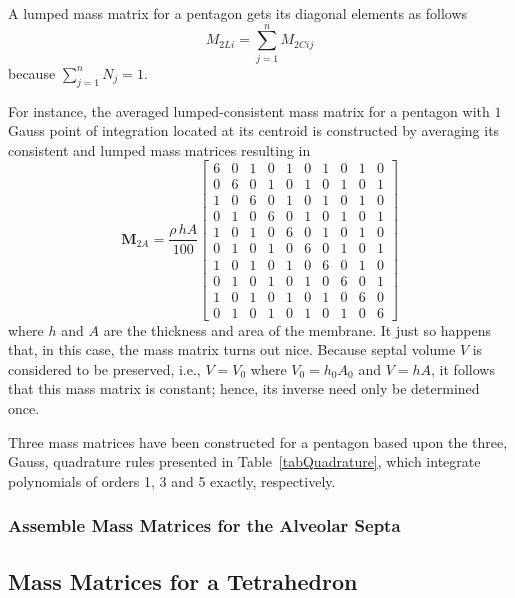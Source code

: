 A lumped mass matrix for a pentagon gets its diagonal elements as follows
\begin{equation}
{M}_{2Li} = \sum_{j=1}^n M_{2Cij}
\label{LumMass2D}
\end{equation}
because $\sum_{j=1}^n N_j = 1$. 

For instance, the averaged lumped-consistent mass matrix for a pentagon with $1$ Gauss point of integration located at its centroid is constructed by averaging its consistent and lumped mass matrices resulting in
\begin{equation}
\mathbf{M}_{2A}  = \frac{\rho \, h A}{100}
\begin{bmatrix}
6 & 0 & 1 & 0 & 1 & 0 & 1 & 0 & 1 & 0 \\
0 & 6 & 0 & 1 & 0 & 1 & 0 & 1 & 0 & 1 \\
1 & 0 & 6 & 0 & 1 & 0 & 1 & 0 & 1 & 0 \\
0 & 1 & 0 & 6 & 0 & 1 & 0 & 1 & 0 & 1 \\
1 & 0 & 1 & 0 & 6 & 0 & 1 & 0 & 1 & 0 \\
0 & 1 & 0 & 1 & 0 & 6 & 0 & 1 & 0 & 1 \\
1 & 0 & 1 & 0 & 1 & 0 & 6 & 0 & 1 & 0 \\
0 & 1 & 0 & 1 & 0 & 1 & 0 & 6 & 0 & 1 \\
1 & 0 & 1 & 0 & 1 & 0 & 1 & 0 & 6 & 0 \\
0 & 1 & 0 & 1 & 0 & 1 & 0 & 1 & 0 & 6 
\end{bmatrix} 
\label{LumconsMassMatrix2D}
\end{equation}
where $h$ and $A$ are the thickness and area of the membrane.  It just so happens that, in this case, the mass matrix turns out nice.  Because septal volume $V$ is considered to be preserved, i.e., $V = V_0$ where $V_0 = h_0 A_0$ and $V = h A$, it follows that this mass matrix is constant; hence, its inverse need only be determined once.

Three mass matrices have been constructed for a pentagon based upon the three, Gauss, quadrature rules presented in Table~\ref{tabQuadrature}, which integrate polynomials of orders 1, 3 and 5 exactly, respectively. 

\subsubsection{Assemble Mass Matrices for the Alveolar Septa}


\subsection{Mass Matrices for a Tetrahedron}

